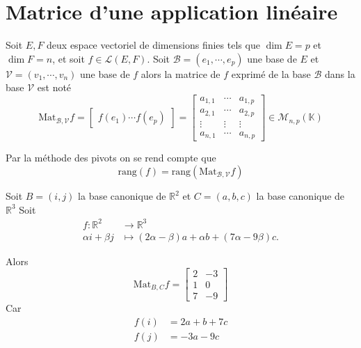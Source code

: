 \documentclass[11pt,colorlinks]{book}
\theoremstyle{mytheoremstyle}
\theoremstyle{mytheoremstyle}
\theoremstyle{mytheoremstyle}
\theoremstyle{mytheoremstyle}
\theoremstyle{mytheoremstyle}
\theoremstyle{mytheoremstyle}
\theoremstyle{mytheoremstyle}
\theoremstyle{mytheoremstyle}
\theoremstyle{myproblemstyle}
\def\mbb#1{\mathbb{#1}}
\def\mfc#1{\mathcal{#1}}
\def\bR{\mbb{R}}
\def\bK{\mbb{K}}
\def\ev{espace vectoriel }
\def\mor{\mfc{L}(E,F)}
\newcommand{\vfunc}[5]{
  \begin{align*}
    #1 \colon #2 &\to #3\\
    #4 &\mapsto #5.
  \end{align*}
}
\begin{document}
\section{Matrice d'une application linéaire}
\begin{definition}
  Soit $E,F$ deux \ev de dimensions finies tels que $\dim E = p$ et $\dim F = n$, et soit $f \in \mor$.
  Soit $\mfc{B} = (e_1,\cdots,e_p)$ une base de $E$ et $\mfc{V} = (v_1,\cdots,v_n)$ une base de $f$ 
  alors la matrice de $f$ exprimé de la base $\mfc{B}$ dans la base $\mfc{V}$ est noté
  \begin{equation*}
    \text{Mat}_{\mfc{B},\mfc{V}} f = \begin{bmatrix}
      f(e_1) \cdots f(e_p)
    \end{bmatrix} = \begin{bmatrix}
      a_{1,1} & \cdots & a_{1,p} \\
      a_{2,1} & \cdots & a_{2,p} \\ 
      \vdots & \vdots & \vdots \\ 
      a_{n,1} & \cdots & a_{n,p}
    \end{bmatrix} \in \mfc{M}_{n,p}(\bK)
  \end{equation*}
\end{definition}
\begin{rmq}
  Par la méthode des pivots on se rend compte que 
  \begin{equation*}
    \text{rang}(f) = \text{rang}\left(\text{Mat}_{\mfc{B},\mfc{V}} f\right)
  \end{equation*}
\end{rmq}
\begin{ex}
  Soit $B = (i,j)$ la base canonique de $\bR^2$ et $C = (a,b,c)$ la base canonique de $\bR^3$
  Soit \vfunc{f}{\bR^2}{\bR^3}{\alpha i+ \beta j}{(2\alpha - \beta)a + \alpha b + (7\alpha - 9\beta)c}
  Alors 
  \begin{equation*}
    \text{Mat}_{B,C} f = \begin{bmatrix}
      2 & -3 \\ 
      1 & 0 \\ 
      7 & -9
    \end{bmatrix}
  \end{equation*}
  Car 
  \begin{align*}
    f(i) &= 2a + b + 7c \\ 
    f(j) &= -3a -9c
  \end{align*}
\end{ex}
\end{document}
